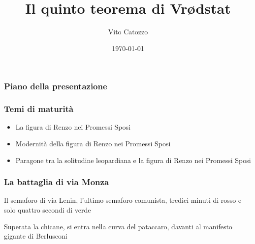 \documentclass{beamer}
\title{Il quinto teorema di Vr\o dstat} %
\author{Vito Catozzo}
\date{\today}
\begin{document}
\frame{\titlepage} %
\begin{frame}
  \frametitle{Piano della presentazione}
  \tableofcontents
\end{frame}
\begin{frame}
  \frametitle{Temi di maturità}
	\begin{itemize}[<+->]
		\item La figura di Renzo nei Promessi Sposi
		\item Modernità della figura di Renzo nei Promessi Sposi
		\item Paragone tra la solitudine leopardiana e la figura di Renzo nei Promessi Sposi
	\end{itemize}
\end{frame}
\begin{frame}
  \frametitle{La battaglia di via Monza}
	Il semaforo di via Lenin, l'ultimo semaforo comunista, tredici minuti di rosso e solo quattro secondi di verde

	Superata la chicane, si entra nella curva del pataccaro, davanti al manifesto gigante di Berlusconi
\end{frame}
\end{document}
